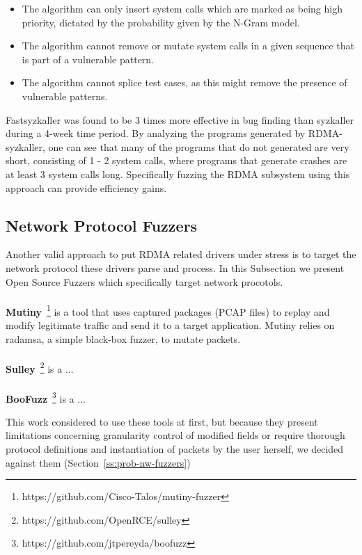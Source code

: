 \begin{itemize}
  \item The algorithm can only insert system calls which are marked as being high priority, dictated by the probability given by the N-Gram model.
  \item The algorithm cannot remove or mutate system calls in a given sequence that is part of a vulnerable pattern.
  \item The algorithm cannot splice test cases, as this might remove the presence of vulnerable patterns.
\end{itemize}

Fastsyzkaller was found to be 3 times more effective in bug finding than syzkaller during a 4-week time period.
By analyzing the programs generated by RDMA-syzkaller, one can see that many of the programs that do not generated are very short, consisting
of 1 - 2 system calls, where programs that generate crashes are at least 3 system calls long. Specifically fuzzing the RDMA subsystem using this
approach can provide efficiency gains.

\subsection{Network Protocol Fuzzers}\label{ss:network-fuzzers}

Another valid approach to put RDMA related drivers under stress is to target the network protocol these drivers
parse and process. In this Subsection we present Open Source Fuzzers which specifically target network procotols.

\paragraph{}\textbf{Mutiny}~\footnote{https://github.com/Cisco-Talos/mutiny-fuzzer}
is a tool that uses captured packages (PCAP files)
to replay and modify legitimate traffic and send it to a target
application. Mutiny relies on radamsa, a simple black-box fuzzer, to mutate packets.

\paragraph{}\textbf{Sulley}~\footnote{https://github.com/OpenRCE/sulley} is a ...

\paragraph{}\textbf{BooFuzz}~\footnote{https://github.com/jtpereyda/boofuzz} is a ...

This work considered to use these tools at first, but because they present
limitations concerning granularity control of modified fields or
require thorough protocol definitions and instantiation
of packets by the user herself, we decided against them (Section~\ref{ss:prob-nw-fuzzers})

